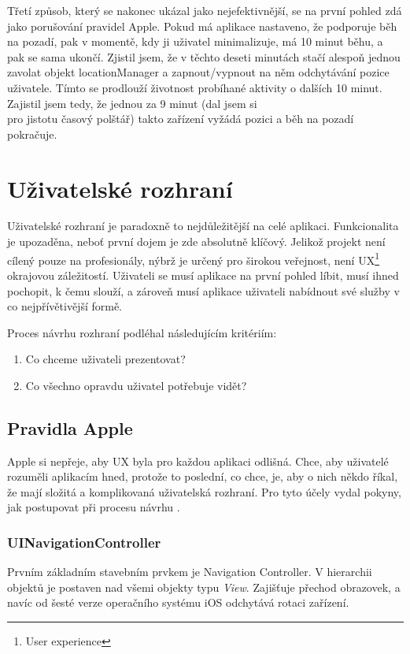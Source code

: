 Třetí způsob, který se nakonec ukázal jako nejefektivnější, se na první pohled zdá jako porušování pravidel Apple. Pokud má aplikace nastaveno, že podporuje běh na pozadí, pak v momentě, kdy ji uživatel minimalizuje, má 10 minut běhu, a pak se sama ukončí. Zjistil jsem, že v těchto deseti minutách stačí alespoň jednou zavolat objekt locationManager a zapnout/vypnout na něm odchytávání pozice uživatele. Tímto se prodlouží životnost probíhané aktivity o dalších 10 minut. Zajistil jsem tedy, že jednou za 9 minut (dal jsem si \\pro jistotu časový polštář) takto zařízení vyžádá pozici a běh na pozadí pokračuje.

\section{Uživatelské rozhraní}
Uživatelské rozhraní je paradoxně to nejdůležitější na celé aplikaci. Funkcionalita je upozaděna, neboť první dojem je zde absolutně klíčový. Jelikož projekt není cílený pouze na profesionály, nýbrž je určený pro širokou veřejnost, není UX\footnote{User experience} okrajovou záležitostí. Uživateli se musí aplikace na první pohled líbit, musí ihned pochopit, k čemu slouží, a zároveň musí aplikace uživateli nabídnout své služby v co nejpřívětivější formě.

Proces návrhu rozhraní podléhal následujícím kritériím:

\begin{enumerate}
	\item Co chceme uživateli prezentovat?
	\item Co všechno opravdu uživatel potřebuje vidět?
\end{enumerate}

\subsection{Pravidla Apple}
Apple si nepřeje, aby UX byla pro každou aplikaci odlišná. Chce, aby uživatelé rozuměli aplikacím hned, protože to poslední, co chce, je, aby o nich někdo říkal, že mají složitá a komplikovaná uživatelská rozhraní. Pro tyto účely vydal pokyny, jak postupovat při procesu návrhu \cite{HIG}.

\subsubsection*{UINavigationController}
Prvním základním stavebním prvkem je Navigation Controller. V hierarchii objektů je postaven nad všemi objekty typu \emph{View}. Zajišťuje přechod obrazovek, a navíc od šesté verze operačního systému iOS odchytává rotaci zařízení.

